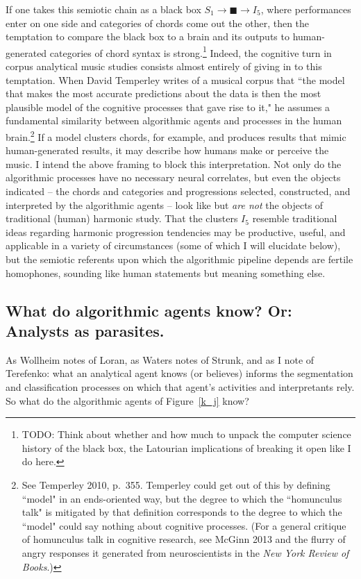If one takes this semiotic chain as a black box $S_1 \rightarrow \blacksquare \rightarrow I_5$, where performances enter on one side and categories of chords come out the other, then the temptation to compare the black box to a brain and its outputs to human-generated categories of chord syntax is strong.\footnote{TODO: Think about whether and how much to unpack the computer science history of the black box, the Latourian implications of breaking it open like I do here.}  Indeed, the cognitive turn in corpus analytical music studies consists almost entirely of giving in to this temptation.  When David Temperley writes of a musical corpus that ``the model that makes the most accurate predictions about the data is then the most plausible model of the cognitive processes that gave rise to it," he assumes a fundamental similarity between algorithmic agents and processes in the human brain.\footnote{See Temperley 2010, p.\ 355.  Temperley could get out of this by defining ``model" in an ends-oriented way, but the degree to which the ``homunculus talk" is mitigated by that definition corresponds to the degree to which the ``model" could say nothing about cognitive processes.  (For a general critique of homunculus talk in cognitive research, see McGinn 2013 and the flurry of angry responses it generated from neuroscientists in the \emph{New York Review of Books}.)}  If a model clusters chords, for example, and produces results that mimic human-generated results, it may describe how humans make or perceive the music.  I intend the above framing to block this interpretation.  Not only do the algorithmic processes have no necessary neural correlates, but even the objects indicated -- the chords and categories and progressions selected, constructed, and interpreted by the algorithmic agents -- look like but \emph{are not} the objects of traditional (human) harmonic study.  That the clusters $I_5$ resemble traditional ideas regarding harmonic progression tendencies may be productive, useful, and applicable in a variety of circumstances (some of which I will elucidate below), but the semiotic referents upon which the algorithmic pipeline depends are fertile homophones, sounding like human statements but meaning something else.

\subsection{What do algorithmic agents know?  Or: Analysts as parasites.}
As Wollheim notes of Loran, as Waters notes of Strunk, and as I note of Terefenko: what an analytical agent knows (or believes) informs the segmentation and classification processes on which that agent's activities and interpretants rely.  So what do the algorithmic agents of Figure~\ref{k_j} know?

